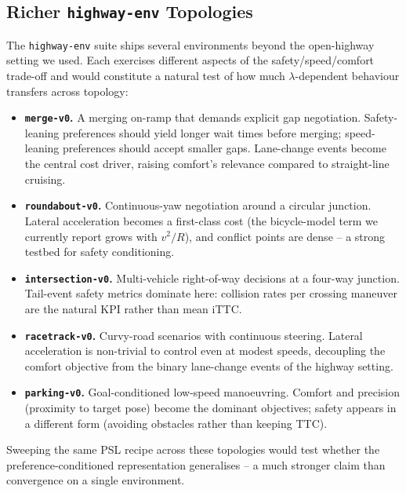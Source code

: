 \documentclass[12pt, letterpaper]{article}
\begin{document}
\subsection{Richer \texttt{highway-env} Topologies}
The \texttt{highway-env} suite \cite{leurent2018highway} ships several environments beyond the open-highway setting we used. Each exercises different aspects of the safety/speed/comfort trade-off and would constitute a natural test of how much $\lambda$-dependent behaviour transfers across topology:
\begin{itemize}
    \item \textbf{\texttt{merge-v0}.} A merging on-ramp that demands explicit gap negotiation. Safety-leaning preferences should yield longer wait times before merging; speed-leaning preferences should accept smaller gaps. Lane-change events become the central cost driver, raising comfort's relevance compared to straight-line cruising.
    \item \textbf{\texttt{roundabout-v0}.} Continuous-yaw negotiation around a circular junction. Lateral acceleration becomes a first-class cost (the bicycle-model term we currently report grows with $v^2 / R$), and conflict points are dense -- a strong testbed for safety conditioning.
    \item \textbf{\texttt{intersection-v0}.} Multi-vehicle right-of-way decisions at a four-way junction. Tail-event safety metrics dominate here: collision rates per crossing maneuver are the natural KPI rather than mean iTTC.
    \item \textbf{\texttt{racetrack-v0}.} Curvy-road scenarios with continuous steering. Lateral acceleration is non-trivial to control even at modest speeds, decoupling the comfort objective from the binary lane-change events of the highway setting.
    \item \textbf{\texttt{parking-v0}.} Goal-conditioned low-speed manoeuvring. Comfort and precision (proximity to target pose) become the dominant objectives; safety appears in a different form (avoiding obstacles rather than keeping TTC).
\end{itemize}
Sweeping the same PSL recipe across these topologies would test whether the preference-conditioned representation generalises -- a much stronger claim than convergence on a single environment.
\end{document}

